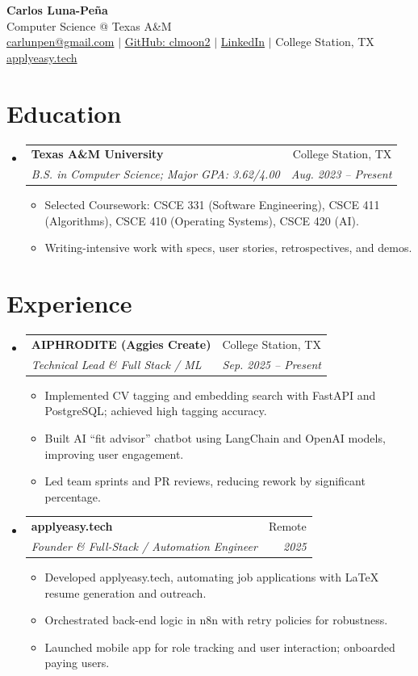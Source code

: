 \documentclass[letterpaper,11pt]{article}
\makeatletter
\newcommand{\resumeItem}[1]{
  \item\small{{#1 \vspace{-2pt}}}
}
\newcommand{\resumeSubheading}[4]{
  \vspace{-2pt}\item
  \begin{tabular*}{0.97\textwidth}[t]{l@{\extracolsep{\fill}}r}
    \textbf{#1} & #2 \\
    \textit{\small#3} & \textit{\small #4} \\
  \end{tabular*}\vspace{-7pt}
}
\newcommand{\resumeSubHeadingListStart}{\begin{itemize}[leftmargin=0.15in, label={}]}
\newcommand{\resumeSubHeadingListEnd}{\end{itemize}}
\newcommand{\resumeItemListStart}{\begin{itemize}}
\newcommand{\resumeItemListEnd}{\end{itemize}\vspace{-5pt}}
\makeatother
\begin{document}
\begin{center}
  \textbf{\LARGE Carlos Luna-Peña} \\ \vspace{2pt}
  Computer Science @ Texas A\&M \\ \vspace{1pt}
  \href{mailto:carlunpen@gmail.com}{carlunpen@gmail.com} $|$ \href{https://github.com/clmoon2}{GitHub: clmoon2} $|$ \href{https://linkedin.com/in/carlos-luna}{LinkedIn} $|$ College Station, TX \\
  \href{https://applyeasy.tech}{applyeasy.tech}
\end{center}

\section{Education}
\resumeSubHeadingListStart
\resumeSubheading
{Texas A\&M University}{College Station, TX}
{B.S. in Computer Science; Major GPA: 3.62/4.00}{Aug. 2023 -- Present}
\resumeItemListStart
\resumeItem{Selected Coursework: CSCE 331 (Software Engineering), CSCE 411 (Algorithms), CSCE 410 (Operating Systems), CSCE 420 (AI).}
\resumeItem{Writing-intensive work with specs, user stories, retrospectives, and demos.}
\resumeItemListEnd
\resumeSubHeadingListEnd

\section{Experience}
\resumeSubHeadingListStart
\resumeSubheading
{AIPHRODITE (Aggies Create)}{College Station, TX}
{Technical Lead \& Full Stack / ML}{Sep. 2025 -- Present}
\resumeItemListStart
\resumeItem{Implemented CV tagging and embedding search with FastAPI and PostgreSQL; achieved high tagging accuracy.}
\resumeItem{Built AI “fit advisor” chatbot using LangChain and OpenAI models, improving user engagement.}
\resumeItem{Led team sprints and PR reviews, reducing rework by significant percentage.}
\resumeItemListEnd
\resumeSubheading
{applyeasy.tech}{Remote}
{Founder \& Full-Stack / Automation Engineer}{2025}
\resumeItemListStart
\resumeItem{Developed applyeasy.tech, automating job applications with LaTeX resume generation and outreach.}
\resumeItem{Orchestrated back-end logic in n8n with retry policies for robustness.}
\resumeItem{Launched mobile app for role tracking and user interaction; onboarded paying users.}
\resumeItemListEnd
\resumeSubHeadingListEnd
\end{document}
